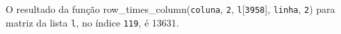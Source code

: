 \documentclass[12pt,varwidth=16cm,border=1pt]{standalone}
\begin{document}
O resultado da função row\_times\_column(\verb+coluna+, \verb+2+, \verb+l+[\verb+3958+], \verb+linha+, \verb+2+) para matriz da lista \verb+l+, no índice \verb+119+, é 13631.

\questiomfalse
\end{document}
